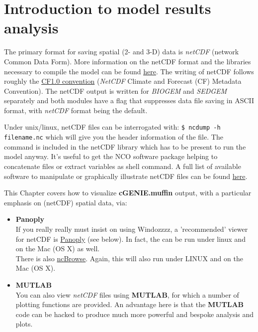 \documentclass[11pt,fleqn]{book} %
\begin{document}
\chapter{Introduction to model results analysis}

\hfill \break

\vspace{21mm}

\noindent The primary format for saving spatial (2- and 3-D) data is \textit{netCDF} (network Common Data Form). More information on the netCDF format and the libraries necessary to compile the model can be found \href{http://www.unidata.ucar.edu/software/netcdf}{here}.
The writing of netCDF follows roughly the \href{http://www.cgd.ucar.edu/cms/eaton/cf-metadata/index.html}{CF1.0 convention} (\textit{NetCDF} Climate and Forecast (CF) Metadata Convention).
The netCDF output is written for \textit{BIOGEM} and \textit{SEDGEM} separately and both modules have a flag that suppresses data file saving in ASCII format, with \textit{netCDF} format being the default.

Under unix/linux, netCDF files can be interrogated with: \texttt{\$ ncdump -h filename.nc} which will give you the header information of the file. The command is included in the netCDF library which has to be present to run the model anyway. It's useful to get the NCO software package helping to concatenate files or extract variables as shell command. A full list of available software to manipulate or graphically illustrate netCDF files can be found \href{http://www.unidata.ucar.edu/software/netcdf/software.html}{here}.

\vspace{4pt}
This Chapter covers how to visualize \textbf{cGENIE.muffin} output, with a particular emphasis on (netCDF) spatial data, via:

\vspace{4pt}
\begin{itemize}
        \item \textbf{Panoply}
        \\ If you really really must insist on using Windozzzz, a 'recommended' viewer for netCDF is \href{http://www.giss.nasa.gov/tools/panoply/}{Panoply} (see below). In fact, the can be run under linux and on the Mac (OS X) as well.
        \\ There is also \href{http://www.epic.noaa.gov/java/ncBrowse/}{ncBrowse}. Again, this will also run under LINUX and on the Mac (OS X).
        \item \textbf{MUTLAB}
        \\ You can also view \textit{netCDF} files using \textbf{MUTLAB}, for which a number of plotting functions are provided. An advantage here is that the \textbf{MUTLAB} code can be hacked to produce much more powerful and bespoke analysis and plots.
\end{itemize}
\end{document}
